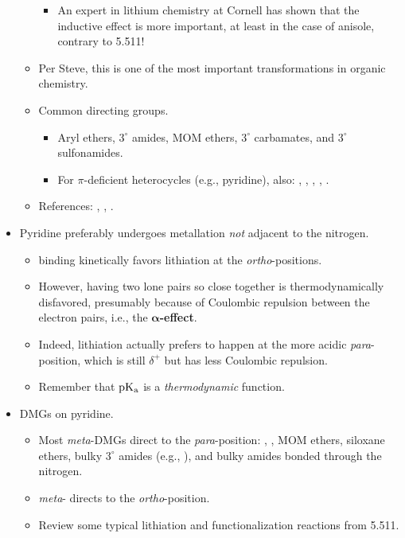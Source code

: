 \documentclass[../notes.tex]{subfiles}
\begin{document}
\begin{itemize}
\begin{itemize}
\begin{itemize}
            \item An expert in lithium chemistry at Cornell has shown that the inductive effect is more important, at least in the case of anisole, contrary to 5.511!
        \end{itemize}
        \item Per Steve, this is one of the most important transformations in organic chemistry.
        \item Common directing groups.
        \begin{itemize}
            \item Aryl ethers, $3^\circ$ amides, MOM ethers, $3^\circ$ carbamates, and $3^\circ$ sulfonamides.
            \item For $\pi$-deficient heterocycles (e.g., pyridine), also: , , , , .
        \end{itemize}
        \item References: \textcite{bib:DMGRev1}, \textcite{bib:DMGRev2}, \textcite{bib:DMGRev3}.
    \end{itemize}
    \pagebreak
    \item Pyridine preferably undergoes metallation \emph{not} adjacent to the nitrogen.
    \begin{itemize}
        \item {} binding kinetically favors lithiation at the \emph{ortho}-positions.
        \item However, having two lone pairs so close together is thermodynamically disfavored, presumably because of Coulombic repulsion between the electron pairs, i.e., the \textbf{$\bm{\alpha}$-effect}.
        \item Indeed, lithiation actually prefers to happen at the more acidic \emph{para}-position, which is still $\delta^+$ but has less Coulombic repulsion.
        \item Remember that $\operatorname{\text{p}K_\text{a}}$ is a \emph{thermodynamic} function.
    \end{itemize}
    \item DMGs on pyridine.
    \begin{itemize}
        \item Most \emph{meta}-DMGs direct to the \emph{para}-position: , , MOM ethers, siloxane ethers, bulky $3^\circ$ amides (e.g., ), and bulky amides bonded through the nitrogen.
        \item \emph{meta}- directs to the \emph{ortho}-position.
        \item Review some typical lithiation and functionalization reactions from 5.511.

\end{itemize}
\end{itemize}
\end{document}
